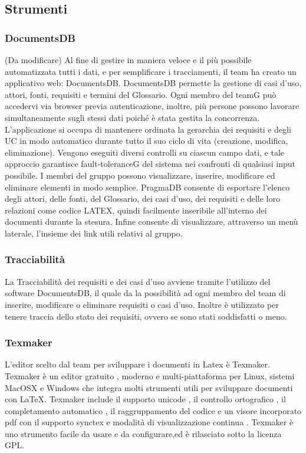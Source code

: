 \subsection{Strumenti}

\subsubsection{DocumentsDB}(Da modificare)
Al fine di gestire in maniera veloce e il più possibile automatizzata tutti i dati, e
per semplificare i tracciamenti, il team ha creato un applicativo web: DocumentsDB.
DocumentsDB permette la gestione di casi d’uso, attori, fonti, requisiti e termini del Glossario. Ogni membro del teamG può accedervi via browser previa autenticazione, inoltre, più persone possono lavorare simultaneamente sugli stessi dati poiché è stata gestita la concorrenza. L’applicazione si occupa di mantenere ordinata la gerarchia dei requisiti e degli UC in modo automatico durante tutto il suo ciclo di vita (creazione, modifica, eliminazione).
Vengono eseguiti diversi controlli su ciascun campo dati, e tale approccio garantisce fault-toleranceG del sistema nei confronti di qualsiasi input possibile. I membri del gruppo possono visualizzare, inserire, modificare ed eliminare elementi in modo semplice. PragmaDB consente di esportare l’elenco degli attori, delle fonti, del Glossario, dei casi d’uso, dei requisiti e delle loro relazioni come codice LATEX, quindi facilmente inseribile all’interno dei documenti durante la stesura. Infine consente di visualizzare,
attraverso un menù laterale, l’insieme dei link utili relativi al gruppo.

\subsubsection{Tracciabilità}
La Tracciabilità dei requisiti e dei casi d'uso avviene tramite l'utilizzo del software DocumentsDB, il quale da la possibilità ad ogni membro del team di inserire, modificare o eliminare requisiti o casi d’uso. Inoltre è utilizzato per tenere traccia dello stato dei requisiti, ovvero se sono stati soddisfatti o meno.

\subsubsection{Texmaker}
L'editor scelto dal team per sviluppare i documenti in Latex è Texmaker.  
Texmaker è un editor gratuito , moderno e multi-piattaforma per Linux, sistemi MacOSX e Windows che integra molti strumenti utili per sviluppare documenti con LaTeX.
Texmaker include il supporto unicode , il controllo ortografico , il completamento automatico , il raggruppamento del codice  e un visore incorporato pdf con il supporto synctex e modalità di visualizzazione continua .
Texmaker è uno strumento facile da usare e da configurare,ed è rilasciato sotto la licenza GPL.


